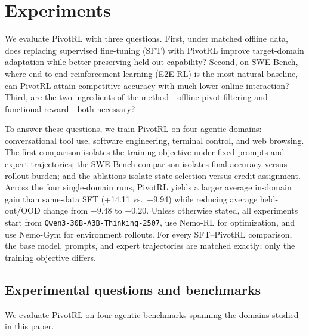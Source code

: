 \section{Experiments}
\label{sec:experiments}

We evaluate PivotRL with three questions. First, under matched offline data, does replacing supervised fine-tuning (SFT) with PivotRL improve target-domain adaptation while better preserving held-out capability? Second, on SWE-Bench, where end-to-end reinforcement learning (E2E RL) is the most natural baseline, can PivotRL attain competitive accuracy with much lower online interaction? Third, are the two ingredients of the method---offline pivot filtering and functional reward---both necessary?

To answer these questions, we train PivotRL on four agentic domains: conversational tool use, software engineering, terminal control, and web browsing. The first comparison isolates the training objective under fixed prompts and expert trajectories; the SWE-Bench comparison isolates final accuracy versus rollout burden; and the ablations isolate state selection versus credit assignment. Across the four single-domain runs, PivotRL yields a larger average in-domain gain than same-data SFT (+14.11 vs.\ +9.94) while reducing average held-out/OOD change from $-9.48$ to $+0.20$. Unless otherwise stated, all experiments start from \texttt{Qwen3-30B-A3B-Thinking-2507}, use Nemo-RL \citep{nemo-rl} for optimization, and use Nemo-Gym \citep{nemo-gym} for environment rollouts. For every SFT--PivotRL comparison, the base model, prompts, and expert trajectories are matched exactly; only the training objective differs.

\subsection{Experimental questions and benchmarks}
\label{sec:exp_questions_benchmarks}

We evaluate PivotRL on four agentic benchmarks spanning the domains studied in this paper.

